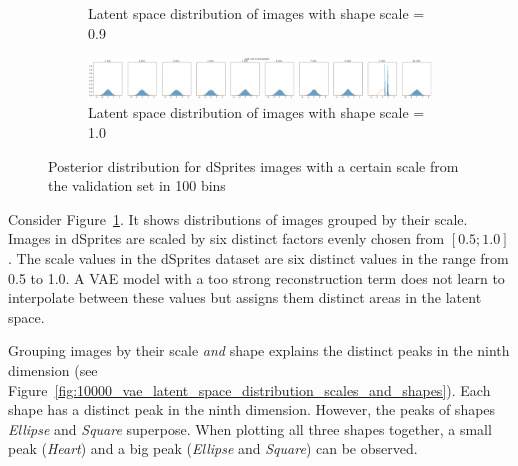 \begin{figure}
\begin{subfigure}{\textwidth}
        \caption{Latent space distribution of images with shape scale = 0.9}
    \end{subfigure}
    \begin{subfigure}{\textwidth}
        \centering
        \includegraphics[width=\textwidth]{images/latent_space_entanglement/vae_dsprites_lf_10000_dist_scale_1_0.png}
        \caption{Latent space distribution of images with shape scale = 1.0}
    \end{subfigure}
    \caption[VAE Latent Space Distribution - dSprites Scales]{Posterior distribution for dSprites images with a certain scale from the validation set in 100 bins}
    \label{fig:10000_vae_latent_space_distribution_scales}
\end{figure}

Consider Figure~\ref{fig:10000_vae_latent_space_distribution_scales}.
It shows distributions of images grouped by their scale.
Images in dSprites are scaled by six distinct factors evenly chosen from $[0.5; 1.0]$.
The scale values in the dSprites dataset are six distinct values in the range from 0.5 to 1.0.
A \ac{VAE} model with a too strong reconstruction term does not learn to interpolate between these values but assigns them distinct areas in the latent space.

Grouping images by their scale \textit{and} shape explains the distinct peaks in the ninth dimension (see Figure~\ref{fig:10000_vae_latent_space_distribution_scales_and_shapes}).
Each shape has a distinct peak in the ninth dimension.
However, the peaks of shapes \textit{Ellipse} and \textit{Square} superpose.
When plotting all three shapes together, a small peak (\textit{Heart}) and a big peak (\textit{Ellipse} and \textit{Square}) can be observed.

